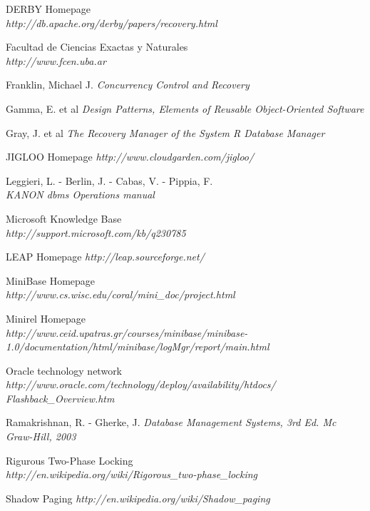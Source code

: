 \begin{thebibliography}{99}
  DERBY Homepage \\ \emph{http://db.apache.org/derby/papers/recovery.html}

  Facultad de Ciencias Exactas y Naturales \\ \emph{http://www.fcen.uba.ar}

  Franklin, Michael J. \emph{Concurrency Control and Recovery}

  Gamma, E. et al \emph{Design Patterns, Elements of Reusable Object-Oriented Software}

  Gray, J. et al \emph{The Recovery Manager of the System R Database Manager}

  JIGLOO Homepage \emph{http://www.cloudgarden.com/jigloo/}
 
  Leggieri, L. - Berlin, J. - Cabas, V. - Pippia, F. \\ \emph{KANON dbms Operations manual}

  Microsoft Knowledge Base \\ \emph{http://support.microsoft.com/kb/q230785}

  LEAP Homepage \emph{http://leap.sourceforge.net/}
  
  MiniBase Homepage \\ \emph{http://www.cs.wisc.edu/coral/mini\_doc/project.html} 
 
  Minirel Homepage \\  \emph{http://www.ceid.upatras.gr/courses/minibase/minibase-1.0/documentation/html/minibase/logMgr/report/main.html} 

  Oracle technology network \\
 \emph{http://www.oracle.com/technology/deploy/availability/htdocs/\\Flashback\_Overview.htm}

  Ramakrishnan, R. - Gherke, J. \emph{Database Management Systems, 3rd Ed. Mc Graw-Hill, 2003}

  Rigurous Two-Phase Locking\\ \emph{http://en.wikipedia.org/wiki/Rigorous\_two-phase\_locking}

  Shadow Paging \emph{http://en.wikipedia.org/wiki/Shadow\_paging}


\end{thebibliography}
